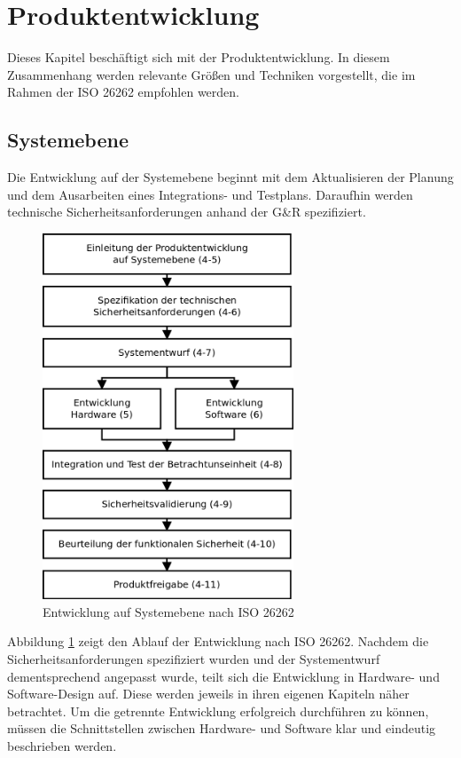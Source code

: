 \documentclass[a4paper,DIV=calc,ngerman]{scrartcl}
\begin{document}
\section{Produktentwicklung}
\label{sec:Produktentwicklung}
Dieses Kapitel beschäftigt sich mit der Produktentwicklung. In diesem Zusammenhang werden relevante Größen und Techniken vorgestellt, die im Rahmen der ISO 26262 empfohlen werden.



\subsection{Systemebene}
\label{sec:Systemebene}
Die Entwicklung auf der Systemebene beginnt mit dem Aktualisieren der Planung und dem Ausarbeiten eines Integrations- und Testplans. Daraufhin werden technische Sicherheitsanforderungen anhand der G\&R spezifiziert.

\begin{figure}
\includegraphics[width=7.5cm]{Abb_6_3}
\caption{Entwicklung auf Systemebene nach ISO 26262\cite{1}}
\label{fig:system}
\end{figure}

Abbildung \ref{fig:system} zeigt den Ablauf der Entwicklung nach ISO 26262. Nachdem die Sicherheitsanforderungen spezifiziert wurden und der Systementwurf dementsprechend angepasst wurde, teilt sich die Entwicklung in Hardware- und Software-Design auf. Diese werden jeweils in ihren eigenen Kapiteln näher betrachtet. Um die getrennte Entwicklung erfolgreich durchführen zu können, müssen die Schnittstellen zwischen Hardware- und Software klar und eindeutig beschrieben werden.
\end{document}
